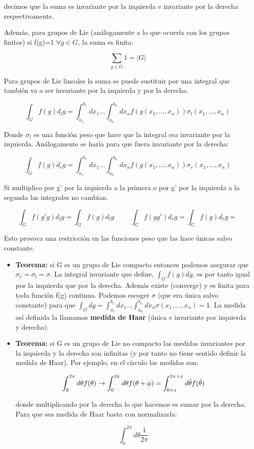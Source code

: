 \documentclass{article}
\begin{document}
     decimos que la suma es invariante por la izquierda e invariante por la derecha respectivamente.
     
     \smallskip
     Además, para grupos de Lie (análogamente a lo que ocurría con los grupos finitos) si f(g)=1 $\forall g \in G$, la suma es finita:
     
     $$\sum _{g \in G} 1 =|G|$$
     
     Para grupos de Lie lineales la suma se puede sustituir por una integral que también va a ser invariante por la izquierda y por la derecha.
     
     $$\int _G f(g)d_lg=\int ^{b_1}_{a_1} dx_1...\int ^{b_n}_{a_n} dx_n f(g(x_1,...,x_n))\sigma _l(x_1,...,x_n)$$
     
     Donde $\sigma _l$ es una función peso que hace que la integral sea invariante por la izquierda. Análogamente se haría para que fuera invariante por la derecha:
     
     $$\int _G f(g)d_rg=\int ^{b_1}_{a_1} dx_1...\int ^{b_n}_{a_n} dx_n f(g(x_1,...,x_n))\sigma _r(x_1,...,x_n)$$
     
     Si multiplico por g' por la izquierda a la primera o por g' por la izquierda a la segunda las integrales no cambian.
     
     $$\int _G f(g'g)d_lg=\int _G f(g)d_lg \hspace{1cm} \int _G f(gg')d_rg=\int _G f(g)d_rg=$$
     
     Esto provoca una restricción en las funciones peso que las hace únicas salvo constante.
     
     \bigskip
     \begin{itemize}
         \item      \textbf{Teorema:} si G es un grupo de Lie compacto entonces podemos asegurar que $\sigma _r=\sigma_l=\sigma$. La integral invariante que define, $\int _G f(g)d g$, es por tanto igual por la izquierda que por la derecha. Además existe (converge) y es finita para toda función f(g) continua. Podemos escoger $\sigma$ (que era única salvo constante) para que $\int _G dg=\int ^{b_1}_{a_1} dx_1...\int ^{b_n}_{a_n} dx_n \sigma (x_1,...,x_n)=1$. La medida así definida la llamamos \textbf{medida de Haar} (única e invariante por izquierda y derecha).
         
         \item \textbf{Teorema:} si G es un grupo de Lie no compacto las medidas invariantes por la izquierda y la derecha son infinitas (y por tanto no tiene sentido definir la medida de Haar). Por ejemplo, en el círculo las medidas son:
         
         $$\int ^{2\pi}_0 d\theta f(\theta) \to \int ^{2\pi}_0 d\theta f(\theta +\phi)= \int ^{2\pi + x}_{0+x} d\Tilde{\theta} f(\Tilde{\theta})$$
         
         donde multiplicando por la derecha lo que hacemos es sumar por la derecha. Para que sea medida de Haar basta con normalizarla:
         
         $$\int ^{2\pi}_0 d \theta \frac{1}{2\pi}$$
         
     \end{itemize} 
\end{document}
